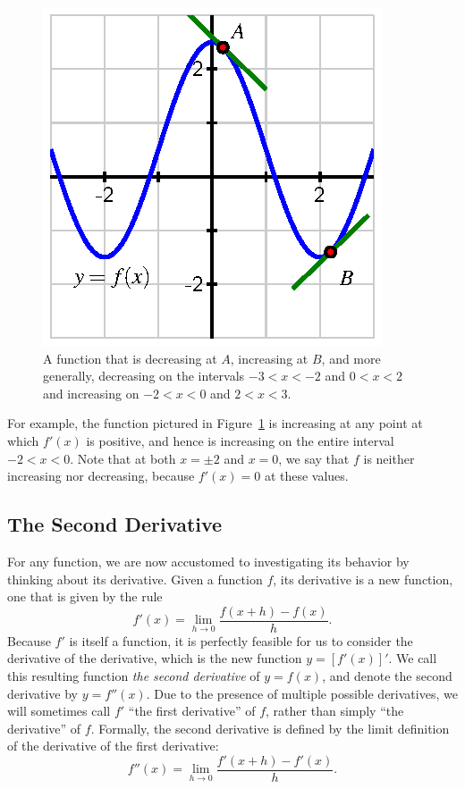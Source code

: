 \begin{figure}[h]
\begin{center}
\includegraphics{figures/1_6_Intro2.eps}
\caption{A function that is decreasing at $A$, increasing at $B$, and more generally, decreasing on the intervals $-3 < x < -2$ and $0 < x  < 2$ and increasing on $-2 < x < 0$ and $2 < x < 3$.} \label{F:1.6.Intro2}
\end{center}
\end{figure}

For example, the function pictured in Figure~\ref{F:1.6.Intro2} is increasing at any point at which $f'(x)$ is positive, and hence is increasing on the entire interval $-2 < x < 0$.  Note that at both $x = \pm 2$ and $x = 0$, we say that $f$ is neither increasing nor decreasing, because $f'(x) = 0$ at these values.

\subsection*{The Second Derivative} 

For any function, we are now accustomed to investigating its behavior by thinking about its derivative.  Given a function $f$, its derivative is a new function, one that is given by the rule
$$f'(x) = \lim_{h \to 0} \frac{f(x+h)-f(x)}{h}.$$
Because $f'$ is itself a function, it is perfectly feasible for us to consider the derivative of the derivative, which is the new function $y = [f'(x)]'$.  We call this resulting function \emph{the second derivative} of $y = f(x)$, and denote the second derivative by $y = f''(x)$.
Due to the presence of multiple possible derivatives, we will sometimes call $f'$ ``the first derivative'' of $f$, rather than simply ``the derivative'' of $f$. Formally, the second derivative is defined by the limit definition of the derivative of the first derivative:
$$f''(x) = \lim_{h \to 0} \frac{f'(x+h)-f'(x)}{h}.$$


